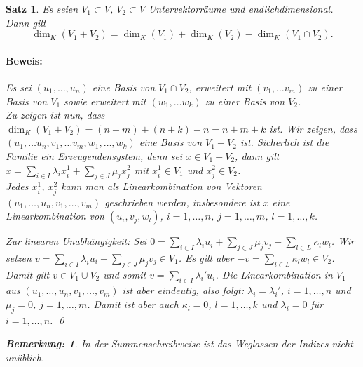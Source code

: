 \documentclass{report}
\newcommand{\lb}{\lambda}
\theoremstyle{customrem}
\newtheorem*{bemerkung}{Bemerkung\textnormal:}
\theoremstyle{customdef}
\newtheorem{satz}[definition]{Satz}
\renewenvironment{proof}{\paragraph{Beweis: }}{\qed}
\begin{document}
	\begin{satz}
		Es seien $V_1 \subset V$, $V_2 \subset V$ Untervektorräume und endlichdimensional. Dann gilt $$\dim_K(V_1 + V_2) = \dim_K(V_1) + \dim_K(V_2) - \dim_K(V_1 \cap V_2).$$
		
		\vspace{.25cm}
		\begin{proof}
			Es sei $(u_1, \ldots, u_n)$ eine Basis von $V_1\cap V_2$, erweitert mit $(v_1, \ldots v_m)$ zu einer Basis von $V_1$ sowie erweitert mit $(w_1, \ldots w_k)$ zu einer Basis von $V_2$. \\
			
			Zu zeigen ist nun, dass $\dim_K(V_1 + V_2) = (n+m) + (n+k) -n = n+m+k$ ist. Wir zeigen, dass $(u_1, \ldots u_n, v_1, \ldots v_m,  w_1, \ldots, w_k)$ eine Basis von $V_1 + V_2$ ist. Sicherlich ist die Familie ein Erzeugendensystem, denn sei $x\in V_1 + V_2$, dann gilt $x = \sum_{i\in I}\lb_i x_i^1 + \sum_{j\in J} \mu_j x_j^2$ mit $x_i^1\in V_1$ und $x_j^2\in V_2$.\\
			
			Jedes $x_i^1$, $x_j^2$ kann man als Linearkombination von Vektoren $(u_1,\ldots, u_n, v_1, \ldots, v_m)$ geschrieben werden, insbesondere ist $x$ eine Linearkombination von $(u_i, v_j, w_l)$, $i = 1,\ldots, n$, $j=1, \ldots, m$, $l = 1, \ldots, k$. 
			
			Zur linearen Unabhängigkeit: Sei $0=\sum_{i\in I}\lb_i u_i + \sum_{j\in J} \mu_j v_j + \sum_{l\in L} \kappa_l w_l$. Wir setzen $v = \sum_{i\in I} \lb_i u_i + \sum_{j \in J} \mu_j v_j\in V_1$. Es gilt aber $-v = \sum_{l\in L}\kappa_l w_l\in V_2$. Damit gilt $v\in V_1 \cup V_2$ und somit $v=\sum_{i\in I}\lb_i'u_i$. Die Linearkombination in $V_1$ aus $(u_1, \ldots, u_n, v_1, \ldots, v_m)$ ist aber eindeutig, also folgt: $\lb_i = \lb_i'$, $i = 1, \ldots, n$ und $\mu_j = 0$, $j =1, \ldots, m$. Damit ist aber auch $\kappa_l=0$, $l=1, \ldots, k$ und $\lb_i=0$ für $i=1, \ldots, n$.
		\end{proof}
		\vspace{.75cm}
		\begin{bemerkung}
			In der Summenschreibweise ist das Weglassen der Indizes nicht unüblich.
		\end{bemerkung}
	\end{satz}
	
\end{document}
